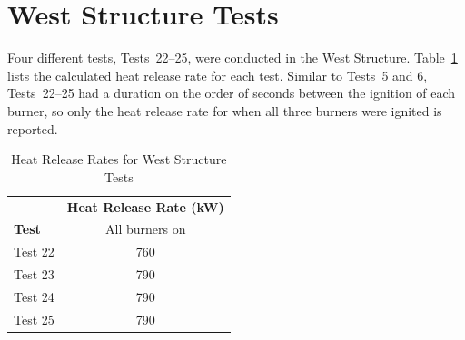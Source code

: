 \documentclass[12pt,oneside]{book}
\begin{document}
\section{West Structure Tests}
\label{sec:west_procedure}
Four different tests, Tests~22--25, were conducted in the West Structure. Table~\ref{table:HRR_West} lists the calculated heat release rate for each test. Similar to Tests~5 and 6, Tests~22--25 had a duration on the order of seconds between the ignition of each burner, so only the heat release rate for when all three burners were ignited is reported.   

\begin{table}[!ht]
\caption{Heat Release Rates for West Structure Tests}
\begin{tabular}{lc}
 \toprule
					& 	\textbf{Heat Release Rate (kW)}	\\
\textbf{Test}		& All burners on \\
 \midrule
Test 22				&     	760 	  \\
Test 23				&     	790 	  \\
Test 24				& 	    790 	  \\
Test 25				&     	790 	  \\
\bottomrule
\end{tabular}
\label{table:HRR_West}
\end{table}
\end{document}
